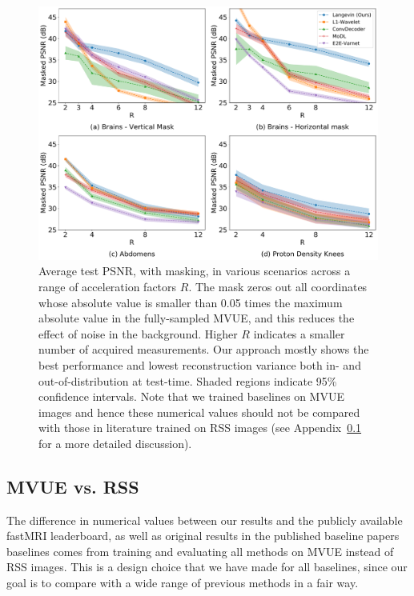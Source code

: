 \begin{figure}
    \centering
    \includegraphics[width=\columnwidth]{main-masked-psnr-comp.pdf}    \caption{\small Average test PSNR, with masking, in various scenarios across a range of acceleration factors $R$. The mask zeros out all coordinates whose absolute value is smaller than 0.05 times the maximum absolute value in the fully-sampled MVUE, and this reduces the effect of noise in the background. Higher $R$ indicates a smaller number of acquired measurements. Our approach mostly shows the best performance and lowest reconstruction variance both in- and out-of-distribution at test-time. Shaded regions indicate 95\% confidence intervals. Note that we trained baselines on MVUE images and hence these numerical values should not be compared with those in literature trained on RSS images (see Appendix~\ref{app:mvue-rss} for a more detailed discussion).}
    \label{fig:main-masked-psnr}
\end{figure}

\subsection{MVUE vs. RSS}\label{app:mvue-rss}
The difference in numerical values between our results and the publicly available fastMRI leaderboard, as well as original results in the published baseline papers baselines comes from training and evaluating all methods on MVUE instead of RSS images. This is a design choice that we have made for all baselines, since our goal is to compare with a wide range of previous methods in a fair way.

